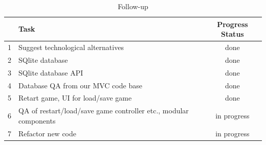 \documentclass[12pt]{article}
\begin{document}
\begin{table}[h!]
\centering
 \begin{tabular}{||l l c ||} 
 \hline
   & Task & Progress Status\\ [0.5ex] 
 \hline\hline
 1 & Suggest technological alternatives & done \\
 2 & SQlite database & done\\
 3 & SQlite database API & done\\
 4 & Database QA from our MVC code base & done\\
 5 & Retart game, UI for load/save game & done\\
 6 & QA of restart/load/save game controller etc., modular components & in progress\\[1ex]
 7 & Refactor new code & in progress\\ 
 \hline
 \end{tabular}
\caption{Follow-up }
\label{table:1}
\end{table}
\end{document}
